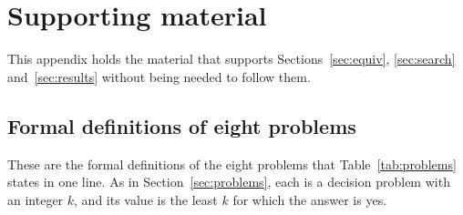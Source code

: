 \section{Supporting material}
\label{app:machinery-all}

This appendix holds the material that supports Sections~\ref{sec:equiv},
\ref{sec:search} and~\ref{sec:results} without being needed to follow them.

\subsection{Formal definitions of eight problems}
\label{app:defs}

These are the formal definitions of the eight problems that
Table~\ref{tab:problems} states in one line. As in Section~\ref{sec:problems},
each is a decision problem with an integer $k$, and its value is the least $k$
for which the answer is yes.

